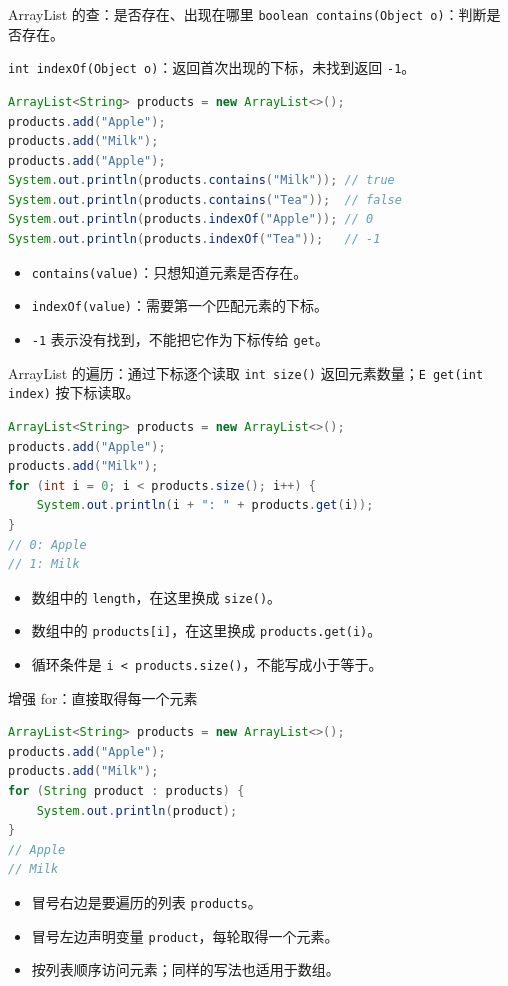 \documentclass[aspectratio=169]{beamer}
\begin{document}
\begin{frame}[fragile]{ArrayList 的查：是否存在、出现在哪里}
  \texttt{boolean contains(Object o)}：判断是否存在。
  \par
  \texttt{int indexOf(Object o)}：返回首次出现的下标，未找到返回 \texttt{-1}。
  \begin{lstlisting}[language=Java]
ArrayList<String> products = new ArrayList<>();
products.add("Apple");
products.add("Milk");
products.add("Apple");
System.out.println(products.contains("Milk")); // true
System.out.println(products.contains("Tea"));  // false
System.out.println(products.indexOf("Apple")); // 0
System.out.println(products.indexOf("Tea"));   // -1
  \end{lstlisting}
  \begin{itemize}
    \item \texttt{contains(value)}：只想知道元素是否存在。
    \item \texttt{indexOf(value)}：需要第一个匹配元素的下标。
    \item \texttt{-1} 表示没有找到，\alert{不能}把它作为下标传给 \texttt{get}。
  \end{itemize}
\end{frame}

\begin{frame}[fragile]{ArrayList 的遍历：通过下标逐个读取}
  \texttt{int size()} 返回元素数量；\texttt{E get(int index)} 按下标读取。
  \begin{lstlisting}[language=Java]
ArrayList<String> products = new ArrayList<>();
products.add("Apple");
products.add("Milk");
for (int i = 0; i < products.size(); i++) {
    System.out.println(i + ": " + products.get(i));
}
// 0: Apple
// 1: Milk
  \end{lstlisting}
  \begin{itemize}
    \item 数组中的 \texttt{length}，在这里换成 \texttt{size()}。
    \item 数组中的 \texttt{products[i]}，在这里换成 \texttt{products.get(i)}。
    \item 循环条件是 \texttt{i < products.size()}，不能写成小于等于。
  \end{itemize}
\end{frame}

\begin{frame}[fragile]{增强 for：直接取得每一个元素}
  \begin{lstlisting}[language=Java]
ArrayList<String> products = new ArrayList<>();
products.add("Apple");
products.add("Milk");
for (String product : products) {
    System.out.println(product);
}
// Apple
// Milk
  \end{lstlisting}
  \begin{itemize}
    \item 冒号右边是要遍历的列表 \texttt{products}。
    \item 冒号左边声明变量 \texttt{product}，每轮取得一个元素。
    \item 按列表顺序访问元素；同样的写法也适用于数组。
  \end{itemize}
\end{frame}
\end{document}
